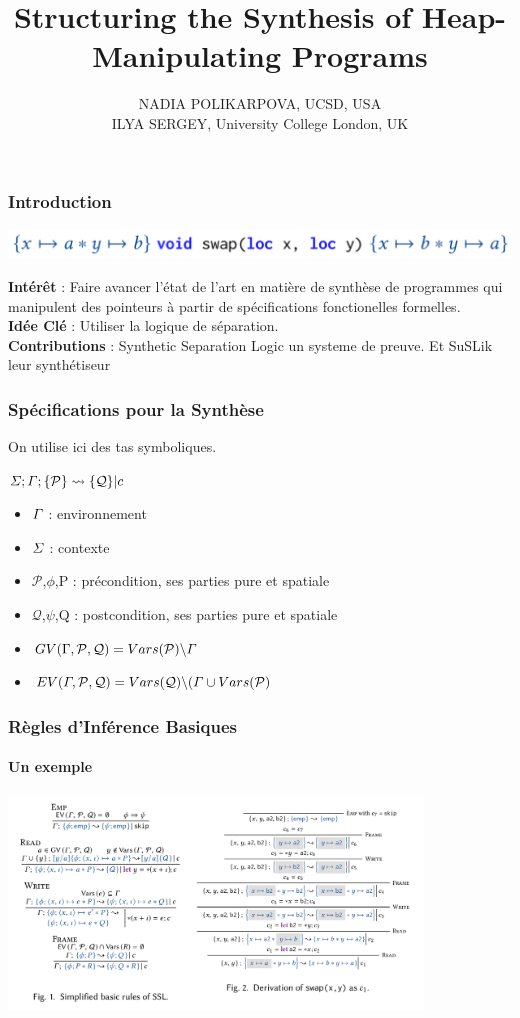 \documentclass[french]{beamer}
\title{Structuring the Synthesis of Heap-Manipulating Programs}
\author{NADIA POLIKARPOVA, UCSD, USA \\ILYA SERGEY, University College London, UK}
\date{}
\begin{document}
	\maketitle
\begin{frame}[fragile]
	\frametitle{Introduction}
	
	\begin{center}
		\includegraphics[height=\baselineskip]{figures/swap.png}
	\end{center}
	\textbf{Intérêt} : Faire avancer l'état de l'art en matière de synthèse de programmes qui manipulent des pointeurs à partir de spécifications fonctionelles formelles.\\
	\textbf{Idée Clé} : Utiliser la logique de séparation.\\
	\textbf{Contributions} : Synthetic Separation Logic un systeme de preuve. Et SuSLik leur synthétiseur
\end{frame}
\begin{frame}[fragile]
	\frametitle{Spécifications pour la Synthèse}
	On utilise ici des tas symboliques.\\
	\begin{center}
	$\mathnormal{\Sigma};\mathnormal{\Gamma};\{\mathcal{P}\}\leadsto\{\mathcal{Q}\} | c$
	\end{center}
	\begin{itemize}
		\item $\mathnormal{\Gamma}$ : environnement
		\item $\mathnormal{\Sigma}$ : contexte
		\item $\mathcal{P}$,$\phi$,P : précondition, ses parties pure et spatiale
		\item $\mathcal{Q}$,$\psi$,Q : postcondition, ses parties pure et spatiale
		\item $GV(\mathrm{\Gamma},\mathcal{P},\mathcal{Q}) = Vars(\mathcal{P}) \backslash \mathnormal{\Gamma}$ 
		\item $EV(\mathnormal{\Gamma},\mathcal{P},\mathcal{Q}) = Vars(\mathcal{Q}) \backslash (\mathnormal{\Gamma} \cup Vars(\mathcal{P})$ 
	\end{itemize}
\end{frame}
\begin{frame}[fragile]
	\frametitle{Règles d'Inférence Basiques}
	\framesubtitle{Un exemple}
	\includegraphics[width=11cm]{figures/basic.png}
\end{frame}
\end{document}
